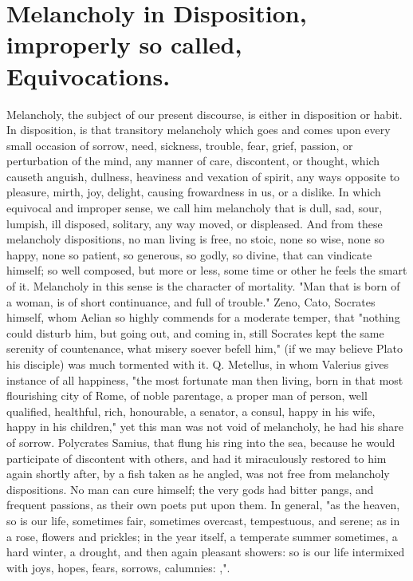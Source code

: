 \clearpage{}
\thispagestyle{titleontop}

\section[Melancholic Disposition]{Melancholy in Disposition, improperly so called, Equivocations.}

Melancholy, the subject of our present discourse, is either in disposition or
habit. In disposition, is that transitory melancholy which goes and comes upon
every small occasion of sorrow, need, sickness, trouble, fear, grief, passion,
or perturbation of the mind, any manner of care, discontent, or thought, which
causeth anguish, dullness, heaviness and vexation of spirit, any ways opposite
to pleasure, mirth, joy, delight, causing frowardness in us, or a dislike. In
which equivocal and improper sense, we call him melancholy that is dull, sad,
sour, lumpish, ill disposed, solitary, any way moved, or displeased. And from
these melancholy dispositions, no man living is free, no
stoic, none so wise, none so happy, none so patient, so generous, so godly, so
divine, that can vindicate himself; so well composed, but more or less, some
time or other he feels the smart of it. Melancholy in this sense is the
character of mortality. "Man that is born of a woman, is of
short continuance, and full of trouble." Zeno, Cato, Socrates himself, whom
Aelian so highly commends for a moderate temper, that
"nothing could disturb him, but going out, and coming in, still Socrates kept
the same serenity of countenance, what misery soever befell him," (if we may
believe Plato his disciple) was much tormented with it. Q. Metellus, in whom
Valerius gives instance of all happiness, "the most
fortunate man then living, born in that most flourishing city of Rome, of noble
parentage, a proper man of person, well qualified, healthful, rich, honourable,
a senator, a consul, happy in his wife, happy in his children," \etc{} yet this
man was not void of melancholy, he had his share of sorrow.
Polycrates Samius, that flung his ring into the sea,
because he would participate of discontent with others, and had it miraculously
restored to him again shortly after, by a fish taken as he angled, was not free
from melancholy dispositions. No man can cure himself; the very gods had bitter
pangs, and frequent passions, as their own poets put upon
them. In general, "as the heaven, so is our life, sometimes
fair, sometimes overcast, tempestuous, and serene; as in a rose, flowers and
prickles; in the year itself, a temperate summer sometimes, a hard winter, a
drought, and then again pleasant showers: so is our life intermixed with joys,
hopes, fears, sorrows, calumnies: ,".

